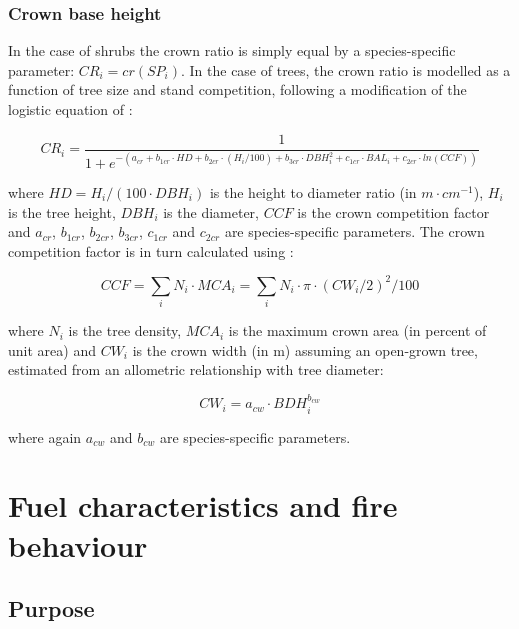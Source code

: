\documentclass[]{book}
\begin{document}
\subsection{Crown base height}\label{crownbaseheight}

In the case of shrubs the crown ratio is simply equal by a
species-specific parameter: \(CR_i = cr(SP_i)\). In the case of trees,
the crown ratio is modelled as a function of tree size and stand
competition, following a modification of the logistic equation of
\citet{Hasenauer1996}:

\begin{equation}
CR_i = \frac{1}{1+e^{-(a_{cr}+b_{1cr}\cdot HD +b_{2cr} \cdot (H_i/100)+b_{3cr} \cdot DBH_i^2+c_{1cr} \cdot BAL_i + c_{2cr} \cdot ln(CCF))}}
\label{eq:treecrownratio}
\end{equation}

where \(HD = H_i/(100\cdot DBH_i)\) is the height to diameter ratio (in
\(m\cdot cm^{-1}\)), \(H_i\) is the tree height, \(DBH_i\) is the
diameter, \(CCF\) is the crown competition factor and \(a_{cr}\),
\(b_{1cr}\), \(b_{2cr}\), \(b_{3cr}\), \(c_{1cr}\) and \(c_{2cr}\) are
species-specific parameters. The crown competition factor is in turn
calculated using \citep{Krajicek1961}:

\begin{equation}
CCF = \sum_{i}{N_i \cdot MCA_i}= \sum_{i}{N_i \cdot \pi \cdot (CW_i/2)^2/100}
\end{equation}

where \(N_i\) is the tree density, \(MCA_i\) is the maximum crown area
(in percent of unit area) and \(CW_i\) is the crown width (in m)
assuming an open-grown tree, estimated from an allometric relationship
with tree diameter:

\begin{equation}
CW_i = a_{cw}\cdot BDH_i^{b_{cw}} 
\end{equation}

where again \(a_{cw}\) and \(b_{cw}\) are species-specific parameters.

\chapter{Fuel characteristics and fire
behaviour}\label{fuel-characteristics-and-fire-behaviour}

\section{Purpose}\label{purpose-1}
\end{document}
